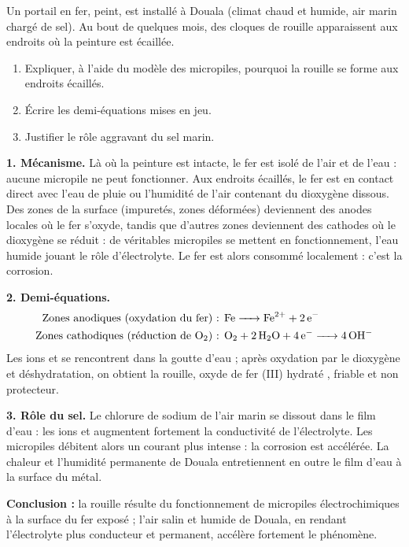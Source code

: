 \documentclass[11pt]{article}
\newcommand{\cle}[1]{{\popxbold\color{popdark}#1}}
\begin{document}
\begin{exoresolu}
Un portail en fer, peint, est installé à Douala (climat chaud et humide, air marin chargé de sel). Au bout de quelques mois, des cloques de rouille apparaissent aux endroits où la peinture est écaillée.
\begin{enumerate}
\item Expliquer, à l'aide du modèle des micropiles, pourquoi la rouille se forme aux endroits écaillés.
\item Écrire les demi-équations mises en jeu.
\item Justifier le rôle aggravant du sel marin.
\end{enumerate}
\tcblower
\textbf{1. Mécanisme.} Là où la peinture est intacte, le fer est isolé de l'air et de l'eau : aucune micropile ne peut fonctionner. Aux endroits écaillés, le fer est en contact direct avec l'eau de pluie ou l'humidité de l'air contenant du dioxygène dissous. Des zones de la surface (impuretés, zones déformées) deviennent des \cle{anodes} locales où le fer s'oxyde, tandis que d'autres zones deviennent des \cle{cathodes} où le dioxygène se réduit : de véritables micropiles se mettent en fonctionnement, l'eau humide jouant le rôle d'électrolyte. Le fer est alors consommé localement : c'est la corrosion.

\textbf{2. Demi-équations.}
\begin{align*}
\text{Zones anodiques (oxydation du fer) : } & \ce{Fe -> Fe^2+ + 2e-}\\
\text{Zones cathodiques (réduction de } \ce{O2}\text{) : } & \ce{O2 + 2H2O + 4e- -> 4OH-}
\end{align*}
Les ions  et  se rencontrent dans la goutte d'eau ; après oxydation par le dioxygène et déshydratation, on obtient la rouille, oxyde de fer (III) hydraté , friable et non protecteur.

\textbf{3. Rôle du sel.} Le chlorure de sodium de l'air marin se dissout dans le film d'eau : les ions  et  augmentent fortement la \cle{conductivité} de l'électrolyte. Les micropiles débitent alors un courant plus intense : la corrosion est accélérée. La chaleur et l'humidité permanente de Douala entretiennent en outre le film d'eau à la surface du métal.

\textbf{Conclusion :} la rouille résulte du fonctionnement de micropiles électrochimiques à la surface du fer exposé ; l'air salin et humide de Douala, en rendant l'électrolyte plus conducteur et permanent, accélère fortement le phénomène.
\end{exoresolu}
\end{document}
